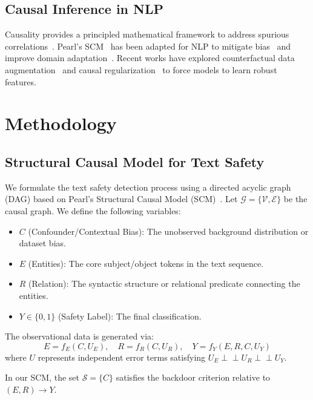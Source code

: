 \documentclass{acmart}
\begin{document}
\subsection{Causal Inference in NLP}
Causality provides a principled mathematical framework to address spurious correlations~\cite{feder2022causal, veitch2021counterfactual}. Pearl's SCM~\cite{pearl2009causality} has been adapted for NLP to mitigate bias~\cite{vig2020investigating} and improve domain adaptation~\cite{wang2021robustness}. Recent works have explored counterfactual data augmentation~\cite{kaushik2019learning} and causal regularization~\cite{wu2023causal} to force models to learn robust features.

\section{Methodology}
\subsection{Structural Causal Model for Text Safety}
We formulate the text safety detection process using a directed acyclic graph (DAG) based on Pearl's Structural Causal Model (SCM)~\cite{pearl2009causality}. Let $\mathcal{G} = \{\mathcal{V}, \mathcal{E}\}$ be the causal graph. We define the following variables:

\begin{itemize}
\item $C$ (Confounder/Contextual Bias): The unobserved background distribution or dataset bias.
\item $E$ (Entities): The core subject/object tokens in the text sequence.
\item $R$ (Relation): The syntactic structure or relational predicate connecting the entities.
\item $Y \in \{0, 1\}$ (Safety Label): The final classification.
\end{itemize}

The observational data is generated via:
\begin{equation}
E = f_E(C, U_E), \quad R = f_R(C, U_R), \quad Y = f_Y(E, R, C, U_Y)
\end{equation}
where $U$ represents independent error terms satisfying $U_E \perp \!\!\! \perp U_R \perp \!\!\! \perp U_Y$.

\begin{lemma}
In our SCM, the set $\mathcal{S} = \{C\}$ satisfies the backdoor criterion relative to $(E, R) \rightarrow Y$.
\end{lemma}
\end{document}
